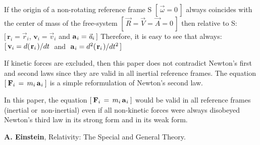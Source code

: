 \documentclass[10pt]{article}
\begin{document}
\par \bigskip\smallskip \noindent If the origin of a non-rotating reference frame S $[ \, {\vec{\omega}} = 0 \, ]$ always coincides with the center of mass of the free-system $[ \, {\vec{\mathit{R}}} = {\vec{\mathit{V}}} = {\vec{\mathit{A}}} = 0 \, ]$ then relative to S: $[ \, {\mathbf{r}}_i = {\vec{\mathit{r}}}_i$, ${\mathbf{v}}_i = {\vec{\mathit{v}}}_i$ and ${\mathbf{a}}_{\hspace{+0.045em}i} = {\vec{\mathit{a}}}_i \, ]$ Therefore, it is easy to see that always: $[ \, {\mathbf{v}}_i = d(\hspace{+0.090em}{\mathbf{r}}_i\hspace{+0.090em})/dt$ $\;$and$\;$ ${\mathbf{a}}_{\hspace{+0.045em}i} = d^2(\hspace{+0.090em}{\mathbf{r}}_i\hspace{+0.090em})/dt^2 \, ]$

\par \bigskip\smallskip \noindent If kinetic forces are excluded, then this paper does not contradict Newton's first and second laws since they are valid in all inertial reference frames. The equation $[ \: {\mathbf{F}}_i \,=\, m_i \, {\mathbf{a}}_{\hspace{+0.045em}i} \: ]$ is a simple reformulation of Newton's second law.

\par \bigskip\smallskip \noindent In this paper, the equation $[ \: {\mathbf{F}}_i \,=\, m_i \, {\mathbf{a}}_{\hspace{+0.045em}i} \: ]$ would be valid in all reference frames (\hspace{+0.180em}inertial \hbox {or non-inertial\hspace{+0.180em})} even if all non-kinetic forces were always disobeyed Newton's third law in its strong form and in its weak form.

\vspace{-0.90em}

\par {}

\par \bigskip\smallskip \noindent \textbf{A. Einstein}, Relativity: The Special and General Theory.
\end{document}
